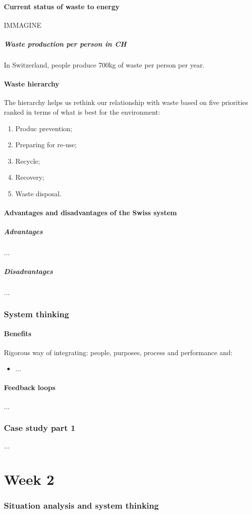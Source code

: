 \documentclass{article}
\begin{document}
\subsection{Current status of waste to energy}
IMMAGINE

\subsubsection{Waste production per person in CH}
In Switzerland, people produce 700kg of waste per person per year.

\subsection{Waste hierarchy}
The hierarchy helps us rethink our relationship with waste based on
five priorities ranked in terms of what is best for the environment:

\begin{enumerate}
    \item Produc prevention;
    \item Preparing for re-use;
    \item Recycle;
    \item Recovery;
    \item Waste disposal.
\end{enumerate}

\subsection{Advantages and disadvantages of the Swiss system}
\subsubsection{Advantages}
...

\subsubsection{Disadvantages}
...

\section{System thinking}
\subsection{Benefits}
Rigorous way of integrating: people, purposes, process and performance and:
\begin{itemize}
    \item ...
\end{itemize}

\subsection{Feedback loops}
...

\section{Case study part 1}
...

\part{Week 2}
\section{Situation analysis and system thinking}
\end{document}
